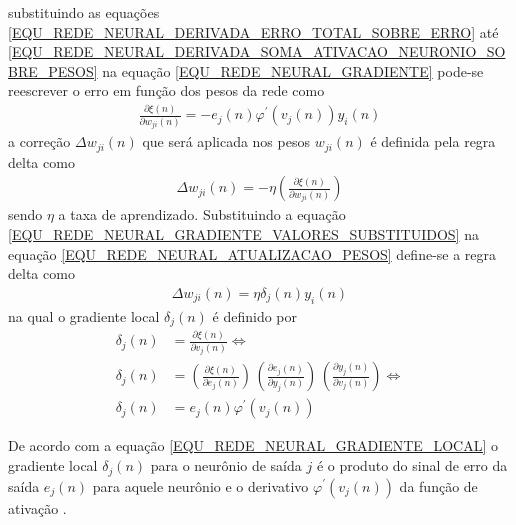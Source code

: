 substituindo as equações \eqref{EQU_REDE_NEURAL_DERIVADA_ERRO_TOTAL_SOBRE_ERRO} até \eqref{EQU_REDE_NEURAL_DERIVADA_SOMA_ATIVACAO_NEURONIO_SOBRE_PESOS} na equação \eqref{EQU_REDE_NEURAL_GRADIENTE} pode-se reescrever o erro em função dos pesos da rede como
\begin{align}
\frac{\partial \xi(n)}{\partial w_{ji}(n)} =
-e_{j}(n)\varphi^{'}(v_{j}(n))y_{i}(n)
\label{EQU_REDE_NEURAL_GRADIENTE_VALORES_SUBSTITUIDOS}
\end{align}
a correção \(\Delta w_{ji}(n)\) que será aplicada nos pesos \(w_{ji}(n)\) é definida pela regra delta como
\begin{align}
\Delta w_{ji}(n) = - \eta \left( \frac{\partial \xi(n)}{\partial w_{ji}(n)} \right) 
\label{EQU_REDE_NEURAL_ATUALIZACAO_PESOS}
\end{align}
sendo \(\eta\) a taxa de aprendizado. Substituindo a equação \eqref{EQU_REDE_NEURAL_GRADIENTE_VALORES_SUBSTITUIDOS} na equação \eqref{EQU_REDE_NEURAL_ATUALIZACAO_PESOS} define-se a regra delta como
\begin{align}
\Delta w_{ji}(n) = \eta \delta_{j}(n)y_{i}(n) 
\label{EQU_REDE_NEURAL_ATUALIZACAO_PESOS_COM_GRADIENTE_LOCAL}
\end{align}
na qual o gradiente local \(\delta_{j}(n)\) é definido por
\begin{align}
\nonumber \delta_{j}(n) &= \frac{\partial \xi(n)}{\partial v_{j}(n)} \Leftrightarrow \\ 
 	      \delta_{j}(n) &= \left( \frac{\partial \xi(n)}{\partial e_{j}(n)} \right) \, \left( \frac{\partial e_{j}(n)}{\partial y_{j}(n)} \right) \, \left( \frac{\partial y_{j}(n)}{\partial v_{j}(n)} \right) \Leftrightarrow \label{EQU_REDE_NEURAL_GRADIENTE_LOCAL_ATUALIZACOES}\\
	      \delta_{j}(n) &= e_{j}(n)\varphi^{'}(v_{j}(n))
\label{EQU_REDE_NEURAL_GRADIENTE_LOCAL}
\end{align}

De acordo com a equação \eqref{EQU_REDE_NEURAL_GRADIENTE_LOCAL} o gradiente local \(\delta_{j}(n)\) para o neurônio de saída \(j\) é o produto do sinal de erro da saída \(e_{j}(n)\) para aquele neurônio e o derivativo \(\varphi^{'}(v_{j}(n))\) da função de ativação \cite{Haykin2007}.

